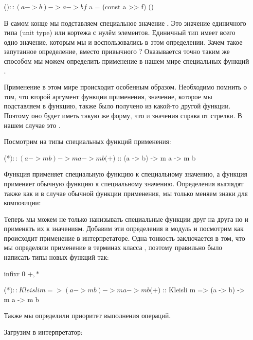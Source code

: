 \begin{code}
($) :: (a -> b) -> a -> b
f $ a = (const a >> f) ()
\end{code}

В самом конце мы подставляем специальное значение \In{()}. Это значение
единичного типа (unit type) или кортежа с нулём элементов. Единичный тип
имеет всего одно значение, которым мы и воспользовались в этом
определении. Зачем такое запутанное определение, вместо привычного
? Оказывается точно таким же способом мы можем определить
применение в нашем мире специальных функций .

Применение в этом мире происходит особенным образом. Необходимо помнить
о том, что второй аргумент функции применения, значение, которое мы
подставляем в функцию, также было получено из какой-то другой функции.
Поэтому оно будет иметь такую же форму, что и значения справа от
стрелки. В нашем случае это .

Посмотрим на типы специальных функций применения:


\begin{code}
(*$) :: (a -> m b) -> m a -> m b
(+$) :: (a -> b)   -> m a -> m b
\end{code}

Функция \In{*$} применяет специальную функцию к специальному значению, а
функция \In{+$} применяет обычную функцию к специальному значению.
Определения выглядят также как и в случае обычной функции применения, мы
только меняем знаки для композиции:



Теперь мы можем не только нанизывать специальные функции друг на друга
но и применять их к значениям. Добавим эти определения в модуль
 и посмотрим как происходит применение в интерпретаторе.
Одна тонкость заключается в том, что мы определяли применение в терминах
класса , поэтому правильно было написать типы новых функций
так:


\begin{code}
infixr 0 +$, *$

(*$) :: Kleisli m => (a -> m b) -> m a -> m b
(+$) :: Kleisli m => (a -> b)   -> m a -> m b
\end{code}

Также мы определили приоритет выполнения операций.

Загрузим в интерпретатор:


